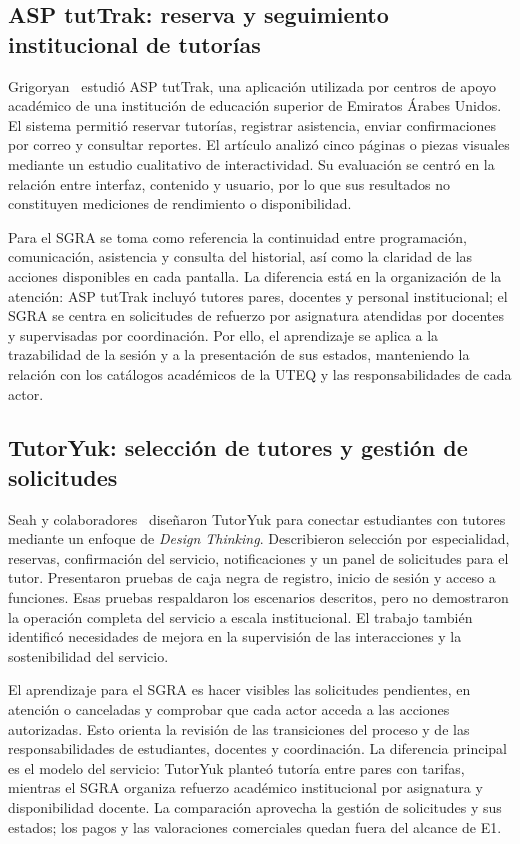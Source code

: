 \subsection{ASP tutTrak: reserva y seguimiento institucional de tutorías}

Grigoryan~\cite{grigoryan2024-tuttrak} estudió ASP tutTrak, una aplicación utilizada por centros de apoyo académico de una institución de educación superior de Emiratos Árabes Unidos. El sistema permitió reservar tutorías, registrar asistencia, enviar confirmaciones por correo y consultar reportes. El artículo analizó cinco páginas o piezas visuales mediante un estudio cualitativo de interactividad. Su evaluación se centró en la relación entre interfaz, contenido y usuario, por lo que sus resultados no constituyen mediciones de rendimiento o disponibilidad.

Para el SGRA se toma como referencia la continuidad entre programación, comunicación, asistencia y consulta del historial, así como la claridad de las acciones disponibles en cada pantalla. La diferencia está en la organización de la atención: ASP tutTrak incluyó tutores pares, docentes y personal institucional; el SGRA se centra en solicitudes de refuerzo por asignatura atendidas por docentes y supervisadas por coordinación. Por ello, el aprendizaje se aplica a la trazabilidad de la sesión y a la presentación de sus estados, manteniendo la relación con los catálogos académicos de la UTEQ y las responsabilidades de cada actor.

\subsection{TutorYuk: selección de tutores y gestión de solicitudes}

Seah y colaboradores~\cite{seah2023-tutoryuk} diseñaron TutorYuk para conectar estudiantes con tutores mediante un enfoque de \textit{Design Thinking}. Describieron selección por especialidad, reservas, confirmación del servicio, notificaciones y un panel de solicitudes para el tutor. Presentaron pruebas de caja negra de registro, inicio de sesión y acceso a funciones. Esas pruebas respaldaron los escenarios descritos, pero no demostraron la operación completa del servicio a escala institucional. El trabajo también identificó necesidades de mejora en la supervisión de las interacciones y la sostenibilidad del servicio.

El aprendizaje para el SGRA es hacer visibles las solicitudes pendientes, en atención o canceladas y comprobar que cada actor acceda a las acciones autorizadas. Esto orienta la revisión de las transiciones del proceso y de las responsabilidades de estudiantes, docentes y coordinación. La diferencia principal es el modelo del servicio: TutorYuk planteó tutoría entre pares con tarifas, mientras el SGRA organiza refuerzo académico institucional por asignatura y disponibilidad docente. La comparación aprovecha la gestión de solicitudes y sus estados; los pagos y las valoraciones comerciales quedan fuera del alcance de E1.

